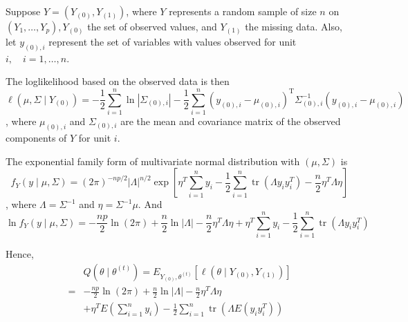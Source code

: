 \begin{example}
    Suppose $Y=\left(Y_{(0)}, Y_{(1)}\right)$, where $Y$ represents a random sample of size $n$ on $\left(Y_{1}, \ldots, Y_{p}\right), Y_{(0)}$ the set of observed values, and $Y_{(1)}$ the missing data. Also, let $y_{(0), i}$ represent the set of variables with values observed for unit $i, \quad i=1, \ldots, n$.

    The loglikelihood based on the observed data is then
    \begin{equation}
        \ell\left(\mu, \Sigma \mid Y_{(0)}\right)=-\frac{1}{2} \sum_{i=1}^{n} \ln \left|\Sigma_{(0), i}\right|-\frac{1}{2} \sum_{i=1}^{n}\left(y_{(0), i}-\mu_{(0), i}\right)^{\mathrm{T}} \Sigma_{(0), i}^{-1}\left(y_{(0), i}-\mu_{(0), i}\right)
    \end{equation}
    , where $\mu_{(0), i}$ and $\Sigma_{(0), i}$ are the mean and covariance matrix of the observed components of $Y$ for unit $i$.

    The exponential family form of multivariate normal distribution with $\left(\mu,\Sigma\right)$ is
    \begin{equation}
        f_{Y}(y\mid\mu,\Sigma)=(2\pi)^{-np/2}|\Lambda|^{n/2}\exp\left[\eta^{T}\sum_{i=1}^{n}y_{i}-\frac{1}{2}\sum_{i=1}^{n}\operatorname{tr}\left(\Lambda y_{i}y_{i}^{T}\right)-\frac{n}{2}\eta^{T}\Lambda\eta\right]
    \end{equation}
    , where $\Lambda=\Sigma^{-1}$ and $\eta=\Sigma^{-1}\mu$. And
    \begin{equation}
        \ln f_{Y}(y\mid\mu,\Sigma)=-\frac{np}{2}\ln(2\pi)+\frac{n}{2}\ln|\Lambda|-\frac{n}{2}\eta^{T}\Lambda\eta+\eta^{T}\sum_{i=1}^{n}y_{i}-\frac{1}{2}\sum_{i=1}^{n}\operatorname{tr}\left(\Lambda y_{i}y_{i}^{T}\right)
    \end{equation}

    Hence,
    \begin{equation}
        \begin{aligned}
              & Q\left(\theta\mid\theta^{(t)}\right)=E_{Y_{(0)},\theta^{(t)}}\left[\ell\left(\theta\mid Y_{(0)},Y_{(1)}\right)\right]                  \\
            = & -\frac{np}{2}\ln(2\pi)+\frac{n}{2}\ln|\Lambda|-\frac{n}{2}\eta^{T}\Lambda\eta                                                          \\
              & +\eta^{T}E\left(\sum_{i=1}^{n}y_{i}\right)-\frac{1}{2}\sum_{i=1}^{n}\operatorname{tr}\left(\Lambda E\left(y_{i}y_{i}^{T}\right)\right)
        \end{aligned}
    \end{equation}


\end{example}
